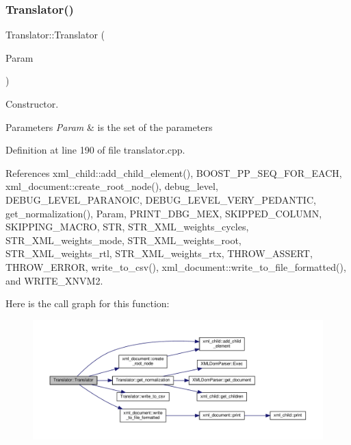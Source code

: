 \subsubsection{\texorpdfstring{Translator()}{Translator()}}
{\footnotesize\ttfamily Translator\+::\+Translator (\begin{DoxyParamCaption}\item[{const \hyperlink{Parameter_8hpp_a37841774a6fcb479b597fdf8955eb4ea}{Parameter\+Const\+Ref}}]{Param }\end{DoxyParamCaption})\hspace{0.3cm}{\ttfamily [explicit]}}



Constructor. 


\begin{DoxyParams}{Parameters}
{\em Param} & is the set of the parameters \\
\hline
\end{DoxyParams}


Definition at line 190 of file translator.\+cpp.



References xml\+\_\+child\+::add\+\_\+child\+\_\+element(), B\+O\+O\+S\+T\+\_\+\+P\+P\+\_\+\+S\+E\+Q\+\_\+\+F\+O\+R\+\_\+\+E\+A\+CH, xml\+\_\+document\+::create\+\_\+root\+\_\+node(), debug\+\_\+level, D\+E\+B\+U\+G\+\_\+\+L\+E\+V\+E\+L\+\_\+\+P\+A\+R\+A\+N\+O\+IC, D\+E\+B\+U\+G\+\_\+\+L\+E\+V\+E\+L\+\_\+\+V\+E\+R\+Y\+\_\+\+P\+E\+D\+A\+N\+T\+IC, get\+\_\+normalization(), Param, P\+R\+I\+N\+T\+\_\+\+D\+B\+G\+\_\+\+M\+EX, S\+K\+I\+P\+P\+E\+D\+\_\+\+C\+O\+L\+U\+MN, S\+K\+I\+P\+P\+I\+N\+G\+\_\+\+M\+A\+C\+RO, S\+TR, S\+T\+R\+\_\+\+X\+M\+L\+\_\+weights\+\_\+cycles, S\+T\+R\+\_\+\+X\+M\+L\+\_\+weights\+\_\+mode, S\+T\+R\+\_\+\+X\+M\+L\+\_\+weights\+\_\+root, S\+T\+R\+\_\+\+X\+M\+L\+\_\+weights\+\_\+rtl, S\+T\+R\+\_\+\+X\+M\+L\+\_\+weights\+\_\+rtx, T\+H\+R\+O\+W\+\_\+\+A\+S\+S\+E\+RT, T\+H\+R\+O\+W\+\_\+\+E\+R\+R\+OR, write\+\_\+to\+\_\+csv(), xml\+\_\+document\+::write\+\_\+to\+\_\+file\+\_\+formatted(), and W\+R\+I\+T\+E\+\_\+\+X\+N\+V\+M2.

Here is the call graph for this function\+:
\nopagebreak
\begin{figure}[H]
\begin{center}
\leavevmode
\includegraphics[width=350pt]{d4/dee/classTranslator_a691eb72bfdf08e15506969d5cba6a400_cgraph}
\end{center}
\end{figure}


